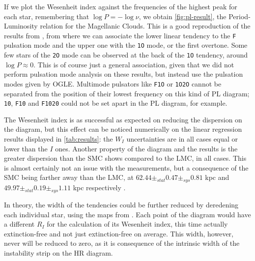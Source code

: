 If we plot the Wesenheit index against the frequencies of the highest peak for each star, remembering that $\log P=-\log \nu$, we obtain \autoref{fig:pl-result},
the Period-Luminosity relation for the Magellanic Clouds. This is a good reproduction of the results from \cite{OGLE2016}, 
from where we can associate the lower linear tendency to the \texttt{F} pulsation mode and the upper one with the \texttt{1O} mode, or the first overtone.
Some few stars of the \texttt{2O} mode can be observed at the back of the \texttt{1O} tendency, around $\log P\approx 0$.
This is of course just a general association, given that we did not perform pulsation mode analysis on these results, but instead use the pulsation modes given by OGLE.
Multimode pulsators like \texttt{F1O} or \texttt{1O2O} cannot be separated from the position of their lowest frequency on this kind of PL diagram;
\texttt{10}, \texttt{F10} and \texttt{F1020} could not be set apart in the PL diagram, for example.

The Wesenheit index is as successful as expected on reducing the dispersion on the diagram,
but this effect can be noticed numerically on the linear regression results displayed in \autoref{tab:results}:
the $W_I$ uncertainties are in all cases equal or lower than the $I$ ones.
Another property of the diagram and the results is the greater dispersion than the SMC shows compared to the LMC, in all cases.
This is almost certainly not an issue with the measurements, but a consequence of the SMC being farther away than the LMC, at $62.44 \pm_{stat} 0.47 \pm_{sys}0.81$ kpc 
and $49.97 \pm_{stat} 0.19 \pm_{sys} 1.11$ kpc respectively \citep{SMC2020,LMC2013}.

In theory, the width of the tendencies could be further reduced by deredening each individual star, using the maps from \cite{Reddening2021}.
Each point of the diagram would have a different $R_I$ for the calculation of its Wesenheit index, this time actually extinction-free and not just extinction-free on average.
This width, however, never will be reduced to zero, as it is consequence of the intrinsic width of the instability strip on the HR diagram.

